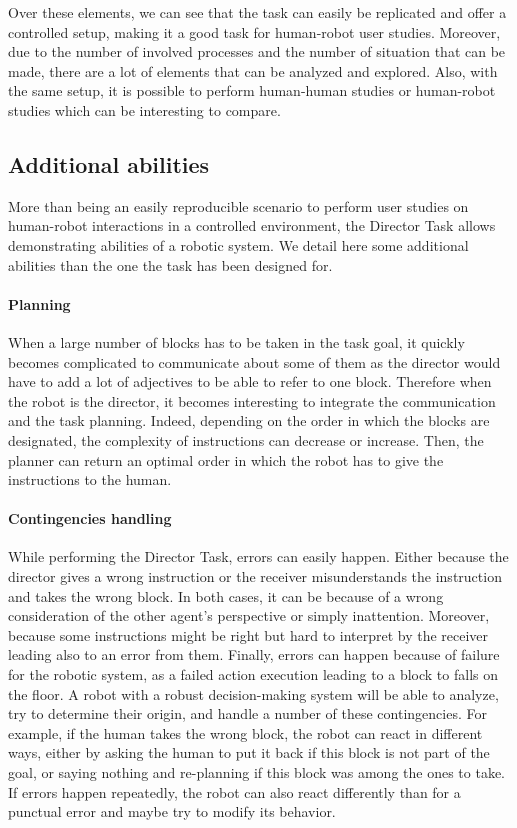 Over these elements, we can see that the task can easily be replicated and offer a controlled setup, making it a good task for human-robot user studies. Moreover, due to the number of involved processes and the number of situation that can be made, there are a lot of elements that can be analyzed and explored. Also, with the same setup, it is possible to perform human-human studies or human-robot studies which can be interesting to compare.

\subsection{Additional abilities}

More than being an easily reproducible scenario to perform user studies on human-robot interactions in a controlled environment, the Director Task allows demonstrating abilities of a robotic system. We detail here some additional abilities than the one the task has been designed for.

\paragraph{Planning} When a large number of blocks has to be taken in the task goal, it quickly becomes complicated to communicate about some of them as the director would have to add a lot of adjectives to be able to refer to one block. Therefore when the robot is the director, it becomes interesting to integrate the communication and the task planning. Indeed, depending on the order in which the blocks are designated, the complexity of instructions can decrease or increase. Then, the planner can return an optimal order in which the robot has to give the instructions to the human.

\paragraph{Contingencies handling} While performing the Director Task, errors can easily happen. Either because the director gives a wrong instruction or the receiver misunderstands the instruction and takes the wrong block. In both cases, it can be because of a wrong consideration of the other agent's perspective or simply inattention. Moreover, because some instructions might be right but hard to interpret by the receiver leading also to an error from them. Finally, errors can happen because of failure for the robotic system, as a failed action execution leading to a block to falls on the floor. A robot with a robust decision-making system will be able to analyze, try to determine their origin, and handle a number of these contingencies. For example, if the human takes the wrong block, the robot can react in different ways, either by asking the human to put it back if this block is not part of the goal, or saying nothing and re-planning if this block was among the ones to take. If errors happen repeatedly, the robot can also react differently than for a punctual error and maybe try to modify its behavior.

